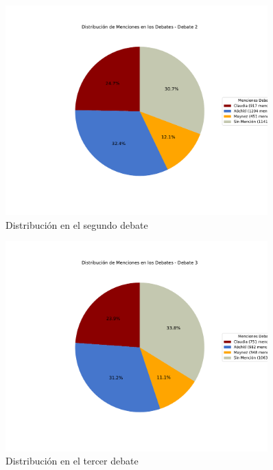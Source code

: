 \documentclass[10pt, a4paper]{article}
\begin{document}
	\begin{figure}[h!]
		\centering
		\includegraphics[width=0.9\textwidth]{grafica_debate2.pdf} %
		\vspace{-15mm}
		\caption{Distribución en el segundo debate}
		\label{fig:distrDebate2} %
	\end{figure}
	
	\begin{figure}[h!]
		\centering
		\includegraphics[width=0.9\textwidth]{grafica_debate3.pdf} %
		\vspace{-15mm}
		\caption{Distribución en el tercer debate}
		\label{fig:distrDebate3} %
	\end{figure}
	
\end{document}

